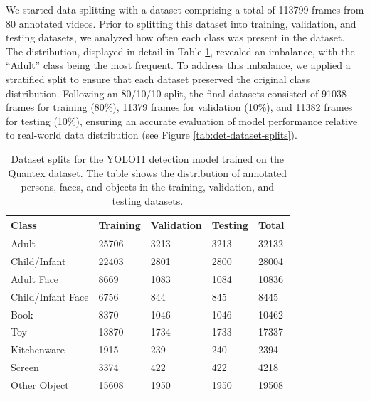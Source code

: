 \documentclass[
  man,floatsintext]{apa6}
\begin{document}
We started data splitting with a dataset comprising a total of 113799 frames from 80 annotated videos. Prior to splitting this dataset into training, validation, and testing datasets, we analyzed how often each class was present in the dataset. The distribution, displayed in detail in Table \ref{tab:det-class-distribution}, revealed an imbalance, with the ``Adult'' class being the most frequent. To address this imbalance, we applied a stratified split to ensure that each dataset preserved the original class distribution. Following an 80/10/10 split, the final datasets consisted of 91038 frames for training (80\%), 11379 frames for validation (10\%), and 11382 frames for testing (10\%), ensuring an accurate evaluation of model performance relative to real-world data distribution (see Figure \ref{tab:det-dataset-splits}).

\begin{table}[tbp]

\begin{center}
\begin{threeparttable}

\caption{\label{tab:det-class-distribution}Dataset splits for the YOLO11 detection model trained on the Quantex dataset. The table shows the distribution of annotated persons, faces, and objects in the training, validation, and testing datasets.}

\begin{tabular}{lllll}
\toprule
Class & \multicolumn{1}{c}{Training} & \multicolumn{1}{c}{Validation} & \multicolumn{1}{c}{Testing} & \multicolumn{1}{c}{Total}\\
\midrule
Adult & 25706 & 3213 & 3213 & 32132\\
Child/Infant & 22403 & 2801 & 2800 & 28004\\
Adult Face & 8669 & 1083 & 1084 & 10836\\
Child/Infant Face & 6756 & 844 & 845 & 8445\\
Book & 8370 & 1046 & 1046 & 10462\\
Toy & 13870 & 1734 & 1733 & 17337\\
Kitchenware & 1915 & 239 & 240 & 2394\\
Screen & 3374 & 422 & 422 & 4218\\
Other Object & 15608 & 1950 & 1950 & 19508\\
\bottomrule
\end{tabular}

\end{threeparttable}
\end{center}

\end{table}
\end{document}
